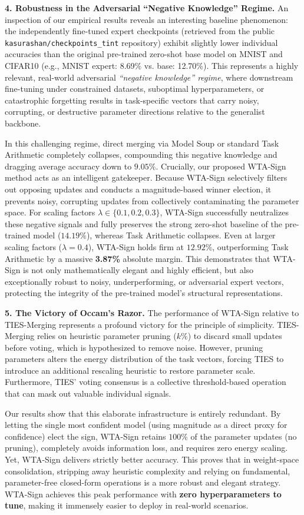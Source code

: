 \textbf{4. Robustness in the Adversarial ``Negative Knowledge'' Regime.}
An inspection of our empirical results reveals an interesting baseline phenomenon: the independently fine-tuned expert checkpoints (retrieved from the public \texttt{kasurashan/checkpoints\_tint} repository) exhibit slightly lower individual accuracies than the original pre-trained zero-shot base model on MNIST and CIFAR10 (e.g., MNIST expert: 8.69\% vs. base: 12.70\%).
This represents a highly relevant, real-world adversarial \emph{``negative knowledge'' regime}, where downstream fine-tuning under constrained datasets, suboptimal hyperparameters, or catastrophic forgetting results in task-specific vectors that carry noisy, corrupting, or destructive parameter directions relative to the generalist backbone.

In this challenging regime, direct merging via Model Soup or standard Task Arithmetic completely collapses, compounding this negative knowledge and dragging average accuracy down to $9.05\%$.
Crucially, our proposed WTA-Sign method acts as an intelligent gatekeeper.
Because WTA-Sign selectively filters out opposing updates and conducts a magnitude-based winner election, it prevents noisy, corrupting updates from collectively contaminating the parameter space.
For scaling factors $\lambda \in \{0.1, 0.2, 0.3\}$, WTA-Sign successfully neutralizes these negative signals and fully preserves the strong zero-shot baseline of the pre-trained model ($14.19\%$), whereas Task Arithmetic collapses.
Even at larger scaling factors ($\lambda = 0.4$), WTA-Sign holds firm at $12.92\%$, outperforming Task Arithmetic by a massive \textbf{3.87\%} absolute margin.
This demonstrates that WTA-Sign is not only mathematically elegant and highly efficient, but also exceptionally robust to noisy, underperforming, or adversarial expert vectors, protecting the integrity of the pre-trained model's structural representations.

\textbf{5. The Victory of Occam's Razor.}
The performance of WTA-Sign relative to TIES-Merging represents a profound victory for the principle of simplicity.
TIES-Merging relies on heuristic parameter pruning ($k\%$) to discard small updates before voting, which is hypothesized to remove noise.
However, pruning parameters alters the energy distribution of the task vectors, forcing TIES to introduce an additional rescaling heuristic to restore parameter scale.
Furthermore, TIES' voting consensus is a collective threshold-based operation that can mask out valuable individual signals.

Our results show that this elaborate infrastructure is entirely redundant.
By letting the single most confident model (using magnitude as a direct proxy for confidence) elect the sign, WTA-Sign retains $100\%$ of the parameter updates (no pruning), completely avoids information loss, and requires zero energy scaling.
Yet, WTA-Sign delivers strictly better accuracy.
This proves that in weight-space consolidation, stripping away heuristic complexity and relying on fundamental, parameter-free closed-form operations is a more robust and elegant strategy.
WTA-Sign achieves this peak performance with \textbf{zero hyperparameters to tune}, making it immensely easier to deploy in real-world scenarios.
